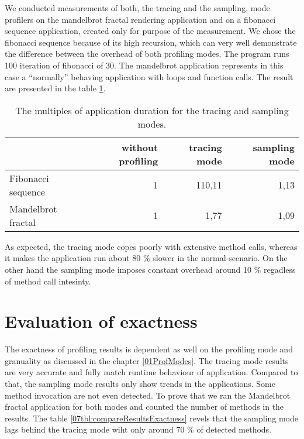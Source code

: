 We conducted measurements of both, the tracing and the sampling, mode profilers on the mandelbrot fractal rendering application and on a fibonacci sequence application, created only for purpose of the measurement. We chose the fibonacci sequence because of its high recursion, which can very well demonstrate the difference between the overhead of both profiling modes. The program runs 100 iteration of fibonacci of 30. The mandelbrot application represents in this case a ``normally'' behaving application with loops and function calls. The result are presented in the table \ref{07tbl:compareResults}. 

\begin{table}
\centering
    \begin{tabular}{|l|r|r|r|}
        \hline
        ~                  & without profiling & tracing mode & sampling mode \\ \hline
        Fibonacci sequence & 1                 & 110,11       & 1,13          \\ 
        Mandelbrot fractal & 1                 & 1,77         & 1,09          \\
        \hline
    \end{tabular}
    \caption{The multiples of application duration for the tracing and sampling modes. }
    \label{07tbl:compareResults}
\end{table}
 
As expected, the tracing mode copes poorly with extensive method calls, whereas it makes the application run about 80 \% slower in the normal-scenario. On the other hand the sampling mode imposes constant overhead around 10 \% regadless of method call intesinty.

\section{Evaluation of exactness}
The exactness of profiling results is dependent as well on the profiling mode and granuality as discussed in the chapter \ref{01ProfModes}. The tracing mode results are very accurate and fully match runtime behaviour of application. Compared to that, the sampling mode results only show trends in the applications. Some method invocation are not even detected. To prove that we ran the Mandelbrot fractal application for both modes and counted the number of methods in the results. The table \ref{07tbl:compareResultsExactness} revels that the sampling mode lags behind the tracing mode wiht only around 70 \% of detected methods.

